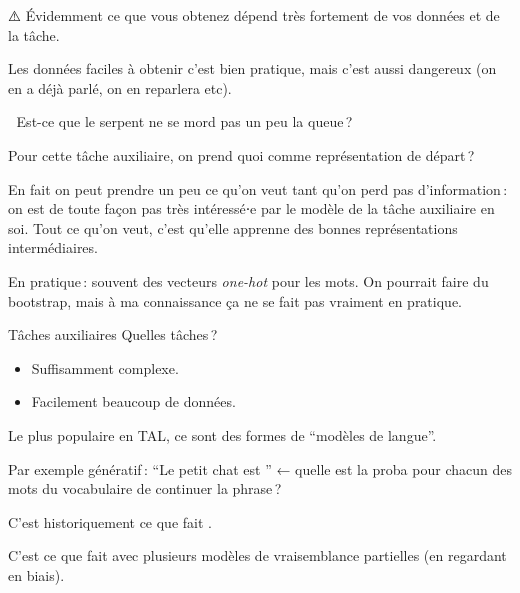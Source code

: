 \documentclass[
	xcolor={svgnames},
	aspectratio=169,
	french,
]{beamer}
\begin{document}
\begin{frame}{⚠️}
	Évidemment ce que vous obtenez dépend très fortement de vos données et de la tâche.

	\pause

	Les données faciles à obtenir c'est bien pratique, mais c'est aussi dangereux (on en a déjà
	parlé, on en reparlera etc).
\end{frame}

\begin{frame}{🐍}
	Est-ce que le serpent ne se mord pas un peu la queue ?

	\pause

	Pour cette tâche auxiliaire, on prend quoi comme représentation de départ ?

	\pause

	En fait on peut prendre un peu ce qu'on veut tant qu'on perd pas d'information : on est de toute
	façon pas très intéressé⋅e par le modèle de la tâche auxiliaire en soi. Tout ce qu'on veut,
	c'est qu'elle apprenne des bonnes représentations intermédiaires.

	\pause

	En pratique : souvent des vecteurs \emph{one-hot} pour les mots. On pourrait faire du bootstrap,
	mais à ma connaissance ça ne se fait pas vraiment en pratique.
\end{frame}

\begin{frame}{Tâches auxiliaires}
	Quelles tâches ?

	\pause

	\begin{itemize}[<+->]
		\item Suffisamment complexe.
		\item Facilement beaucoup de données.
	\end{itemize}

	\pause

	Le plus populaire en TAL, ce sont des formes de \enquote{\alert{modèles de langue}}.

	\pause

	Par exemple génératif : \enquote{Le petit chat est
	\textunderscore\textunderscore\textunderscore} ← quelle est la proba pour chacun des mots du
	vocabulaire de continuer la phrase ?

	\pause

	C'est historiquement ce que fait \textcite{bengio2006NeuralProbabilisticLanguage}.
	
	\pause
	
	C'est ce que fait \textcite{mikolov2013EfficientEstimationWord} avec plusieurs modèles de
	vraisemblance partielles (en regardant en biais).
\end{frame}
\end{document}
